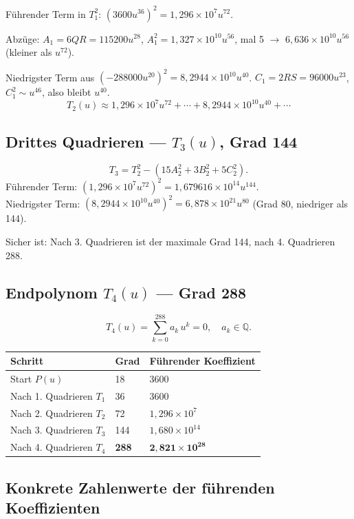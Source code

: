 Führender Term in $T_1^2$: $(3600u^{36})^2=1{,}296\times10^7u^{72}$.

Abzüge: $A_1=6QR=115200u^{28}$,
$A_1^2=1{,}327\times10^{10}u^{56}$,
mal 5 $\to$ $6{,}636\times10^{10}u^{56}$ (kleiner als $u^{72}$).

Niedrigster Term aus $(-288000u^{20})^2=8{,}2944\times10^{10}u^{40}$.
$C_1=2RS=96000u^{23}$, $C_1^2\sim u^{46}$, also bleibt $u^{40}$.
\[
  T_2(u)\approx 1{,}296\times10^7u^{72}+\cdots+8{,}2944\times10^{10}u^{40}+\cdots
\]

\subsection{Drittes Quadrieren — $T_3(u)$, Grad 144}

\[
  T_3 = T_2^2-(15A_2^2+3B_2^2+5C_2^2).
\]
Führender Term: $(1{,}296\times10^7u^{72})^2=1{,}679616\times10^{14}u^{144}$.\\
Niedrigster Term: $(8{,}2944\times10^{10}u^{40})^2=6{,}878\times10^{21}u^{80}$
(Grad 80, niedriger als 144).

Sicher ist: Nach 3. Quadrieren ist der maximale Grad 144, nach 4. Quadrieren 288.

\subsection{Endpolynom $T_4(u)$ — Grad 288}

\[
  T_4(u) = \sum_{k=0}^{288}a_k\,u^k = 0, \quad a_k\in\mathbb{Q}.
\]

\begin{center}
\renewcommand{\arraystretch}{1.4}
\begin{tabular}{lll}
\toprule
\textbf{Schritt} & \textbf{Grad} & \textbf{Führender Koeffizient} \\
\midrule
Start $P(u)$              & 18  & 3600 \\
Nach 1. Quadrieren $T_1$  & 36  & 3600 \\
Nach 2. Quadrieren $T_2$  & 72  & $1{,}296\times10^7$ \\
Nach 3. Quadrieren $T_3$  & 144 & $1{,}680\times10^{14}$ \\
Nach 4. Quadrieren $T_4$  & \textbf{288} & $\mathbf{2{,}821\times10^{28}}$ \\
\bottomrule
\end{tabular}
\end{center}

\subsection{Konkrete Zahlenwerte der führenden Koeffizienten}

